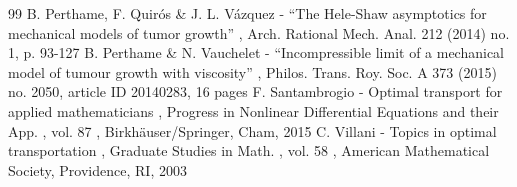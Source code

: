 \documentclass[11pt]{article}
\numberwithin{equation}{section}
\theoremstyle{plain}
\theoremstyle{remark}
\begin{document}
\begin{thebibliography}{99}
 B. Perthame, F. Quirós \& J. L. Vázquez - “The Hele-Shaw asymptotics for mechanical models of tumor growth” , Arch. Rational Mech. Anal. 212 (2014) no. 1, p. 93-127
 B. Perthame \& N. Vauchelet - “Incompressible limit of a mechanical model of tumour growth with viscosity” , Philos. Trans. Roy. Soc. A 373 (2015) no. 2050, article ID 20140283, 16 pages
 F. Santambrogio - Optimal transport for applied mathematicians , Progress in Nonlinear Differential Equations and their App. , vol. 87 , Birkhäuser/Springer, Cham, 2015
 C. Villani - Topics in optimal transportation , Graduate Studies in Math. , vol. 58 , American Mathematical Society, Providence, RI, 2003
\end{thebibliography}
\end{document}
